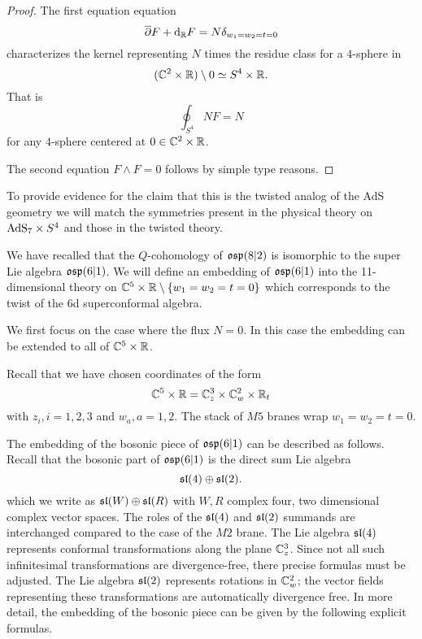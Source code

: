 \begin{proof}
The first equation equation 
\[
\overline{\partial} F + {\rm d}_{\mathbb R} F = N \delta_{w_1=w_2=t=0}
\]
characterizes the kernel representing $N$ times the residue class for a $4$-sphere in 
\[
(\mathbb C^2 \times \mathbb R) \setminus 0 \simeq S^4 \times \mathbb R .
\] 
That is
\[
\oint_{S^4} N F = N 
\]
for any $4$-sphere centered at $0 \in \mathbb C^2 \times \mathbb R$.

The second equation $F \wedge F = 0$ follows by simple type reasons. 
\end{proof}

\parsec[s:m5embedding]

To provide evidence for the claim that this is the twisted analog of the AdS geometry we will match the symmetries present in the physical theory on ${\rm AdS}_7 \times S^4$ and those in the twisted theory. 

We have recalled that the $Q$-cohomology of $\mathfrak{osp}(8|2)$ is isomorphic to the super Lie algebra $\mathfrak{osp}(6|1)$. 
We will define an embedding of $\mathfrak{osp}(6|1)$ into the 11-dimensional theory on $\mathbb C^5 \times \mathbb R \setminus \{w_1=w_2=t=0\}$ which corresponds to the twist of the 6d superconformal algebra.

We first focus on the case where the flux $N=0$.
In this case the embedding can be extended to all of $\mathbb C^5 \times \mathbb R$. 



Recall that we have chosen coordinates of the form
\[
\mathbb C^5 \times \mathbb R = \mathbb C_z^3 \times \mathbb C_w^2 \times \mathbb R_t
\]
with $z_i, i=1,2,3$ and $w_a, a=1,2$.
The stack of $M5$ branes wrap $w_1=w_2=t=0$. 

The embedding of the bosonic piece of $\mathfrak{osp}(6|1)$ can be described as follows. Recall that the bosonic part of $\mathfrak{osp}(6|1)$ is the direct sum Lie algebra
\[
\mathfrak{sl}(4) \oplus \mathfrak{sl}(2) .
\]
which we write as $\mathfrak{sl}(W) \oplus \mathfrak{sl}(R)$ with $W,R$ complex four, two dimensional complex vector spaces. The roles of the $\mathfrak{sl}(4)$ and $\mathfrak{sl}(2)$ summands are interchanged compared to the case of the $M2$ brane. 
The Lie algebra $\mathfrak{sl}(4)$ represents conformal transformations along the plane $\mathbb C^3_z$.
Since not all such infinitesimal transformations are divergence-free, there precise formulas must be adjusted.   
The Lie algebra $\mathfrak{sl}(2)$ represents rotations in $\mathbb C^2_w$; the vector fields representing these transformations are automatically divergence free.
In more detail, the embedding of the bosonic piece can be given by the following explicit formulas. 

